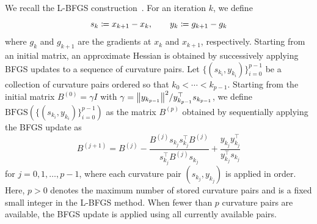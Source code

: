 \documentclass[journal_revised_MPC]{subfiles}
\begin{document}
We recall the L-BFGS construction~\citep{nocedal1999numerical,liuLimitedMemoryBFGS1989,berahasLimitedmemoryBFGSDisplacement2022}.
For an iteration $k$, we define
\begin{equation*}
    s_k \coloneqq x_{k+1}-x_k,\qquad
    y_k \coloneqq g_{k+1}-g_k
\end{equation*}
where $g_k$ and $g_{k+1}$ are the gradients at $x_k$ and $x_{k+1}$, respectively.
Starting from an initial matrix, an approximate Hessian is obtained by successively applying BFGS updates to a sequence of curvature pairs.
Let $\{(s_{k_i},y_{k_i})\}_{i=0}^{p-1}$ be a collection of curvature pairs ordered so that $k_0<\cdots<k_{p-1}$.
Starting from the initial matrix $B^{(0)} = \gamma I$ with $\gamma=\norm{y_{k_{p-1}}}^2 / y_{k_{p-1}}^\top s_{k_{p-1}}$, we define $\mathrm{BFGS}(\{(s_{k_i},y_{k_i})\}_{i=0}^{p-1})$ as the matrix $B^{(p)}$ obtained by sequentially applying the BFGS update as
\begin{equation*}
    B^{(j+1)} = B^{(j)} - \frac{B^{(j)} s_{k_j} s_{k_j}^\top B^{(j)}}{s_{k_j}^\top B^{(j)} s_{k_j}} + \frac{y_{k_j} y_{k_j}^\top}{y_{k_j}^\top s_{k_j}}
\end{equation*}
for $j=0,1,\ldots,p-1$, where each curvature pair $(s_{k_j},y_{k_j})$ is applied in order.
Here, $p>0$ denotes the maximum number of stored curvature pairs and is a fixed small integer in the L-BFGS method.
When fewer than $p$ curvature pairs are available, the BFGS update is applied using all currently available pairs.
\end{document}
